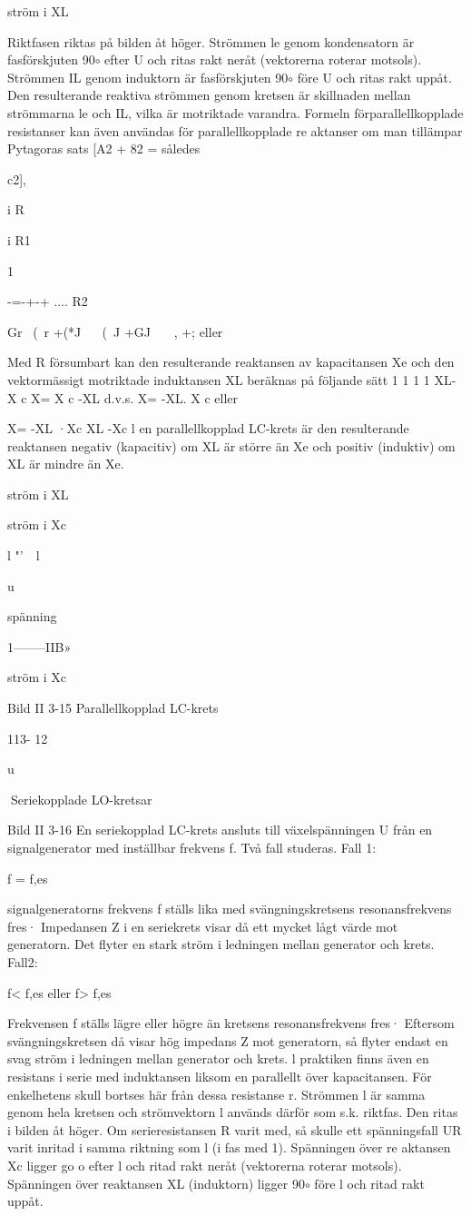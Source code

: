 \documentclass[a4paper,twoside,twocolumn,openright]{book}
\begin{document}
{{{{{ström i XL

Riktfasen riktas på bilden åt höger. Strömmen le genom kondensatorn är fasförskjuten 90$\circ$ efter U och ritas rakt neråt (vektorerna roterar motsols). Strömmen IL genom
induktorn är fasförskjuten 90$\circ$ före U och
ritas rakt uppåt. Den resulterande reaktiva
strömmen genom kretsen är skillnaden mellan strömmarna le och IL, vilka är motriktade
varandra.
Formeln förparallellkopplade resistanser
kan även användas för parallellkopplade
re aktanser om man tillämpar Pytagoras sats
[A2 + 82 =
således

c2],

i
R

i
R1

1

-=-+-+ ....
R2

Gr ~(~r +(*J
~~ (~J +GJ ~~~, +;
eller

Med R försumbart kan den resulterande
reaktansen av kapacitansen Xe och den
vektormässigt motriktade induktansen XL beräknas på följande sätt
1
1
1
1 XL- X c
X= X c -XL d.v.s. X= -XL. X c eller

X= -XL ·Xc
XL -Xc
l en parallellkopplad LC-krets är den resulterande reaktansen negativ (kapacitiv) om XL
är större än Xe och positiv (induktiv) om XL är
mindre än Xe.

ström i XL

ström i Xc

l "'~~l

u

spänning

1--------IIB»

ström i Xc

Bild II 3-15 Parallellkopplad LC-krets

113- 12

u

Seriekopplade LO-kretsar

Bild II 3-16
En seriekopplad LC-krets ansluts till växelspänningen U från en signalgenerator med
inställbar frekvens f. Två fall studeras.
Fall 1:

f = f,es

signalgeneratorns frekvens f ställs lika
med svängningskretsens resonansfrekvens
fres· Impedansen Z i en seriekrets visar då ett
mycket lågt värde mot generatorn. Det flyter
en stark ström i ledningen mellan generator
och krets.
Fall2:

f< f,es eller f> f,es

Frekvensen f ställs lägre eller högre än
kretsens resonansfrekvens fres·
Eftersom svängningskretsen då visar hög
impedans Z mot generatorn, så flyter endast
en svag ström i ledningen mellan generator
och krets.
l praktiken finns även en resistans i serie
med induktansen liksom en parallellt över
kapacitansen. För enkelhetens skull bortses
här från dessa resistanse r.
Strömmen l är samma genom hela kretsen och strömvektorn l används därför som
s.k. riktfas. Den ritas i bilden åt höger. Om
serieresistansen R varit med, så skulle ett
spänningsfall UR varit inritad i samma riktning som l (i fas med 1). Spänningen över
re aktansen Xc ligger go o efter l och ritad rakt
neråt (vektorerna roterar motsols). Spänningen över reaktansen XL (induktorn) ligger
90$\circ$ före l och ritad rakt uppåt.

}}}}}
\end{document}
